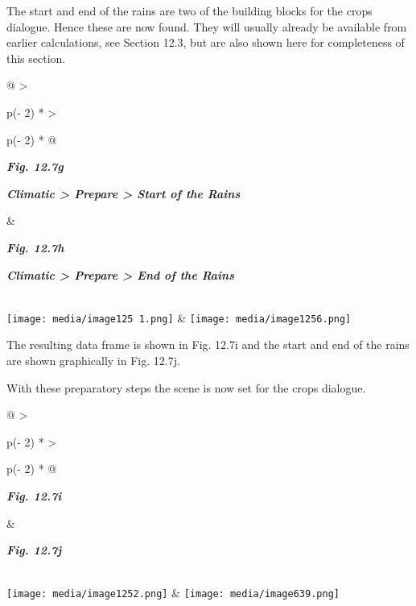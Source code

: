 \documentclass[
  letterpaper,
  DIV=11,
  numbers=noendperiod]{scrreprt}
\begin{document}
The start and end of the rains are two of the building blocks for the
crops dialogue. Hence these are now found. They will usually already be
available from earlier calculations, see Section 12.3, but are also
shown here for completeness of this section.

\begin{longtable}[]{@{}
  >{\raggedright\arraybackslash}p{(\columnwidth - 2\tabcolsep) * }
  >{\raggedright\arraybackslash}p{(\columnwidth - 2\tabcolsep) * }@{}}
\toprule\noalign{}
\begin{minipage}[b]{\linewidth}\raggedright
\textbf{\emph{Fig. 12.7g}}

\textbf{\emph{Climatic \textgreater{} Prepare \textgreater{} Start of
the Rains}}
\end{minipage} & \begin{minipage}[b]{\linewidth}\raggedright
\textbf{\emph{Fig. 12.7h}}

\textbf{\emph{Climatic \textgreater{} Prepare \textgreater{} End of the
Rains}}
\end{minipage} \\
\midrule\noalign{}
\endhead
\bottomrule\noalign{}
\endlastfoot
\texttt{[image: media/image125 1.png]}
&
\texttt{[image: media/image1256.png]} \\
\end{longtable}

The resulting data frame is shown in Fig. 12.7i and the start and end of
the rains are shown graphically in Fig. 12.7j.

With these preparatory steps the scene is now set for the crops
dialogue.

\begin{longtable}[]{@{}
  >{\raggedright\arraybackslash}p{(\columnwidth - 2\tabcolsep) * }
  >{\raggedright\arraybackslash}p{(\columnwidth - 2\tabcolsep) * }@{}}
\toprule\noalign{}
\begin{minipage}[b]{\linewidth}\raggedright
\textbf{\emph{Fig. 12.7i}}
\end{minipage} & \begin{minipage}[b]{\linewidth}\raggedright
\textbf{\emph{Fig. 12.7j}}
\end{minipage} \\
\midrule\noalign{}
\endhead
\bottomrule\noalign{}
\endlastfoot
\texttt{[image: media/image1252.png]}
&
\texttt{[image: media/image639.png]} \\
\end{longtable}
\end{document}
